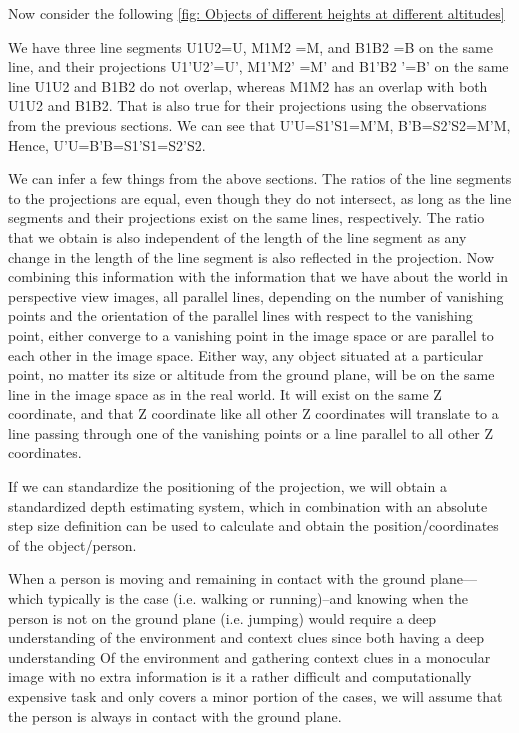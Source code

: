 Now consider the following \ref{fig: Objects of different heights at different altitudes}\newline

We have three line segments U1U2=U, M1M2 =M, and B1B2 =B on the same line, and their projections U1'U2'=U', M1'M2' =M' and B1'B2 '=B' on the same line U1U2 and B1B2 do not overlap, whereas M1M2 has an overlap with both U1U2 and B1B2. That is also true for their projections using the observations from the previous sections. We can see that U'U=S1'S1=M'M, B'B=S2'S2=M'M, Hence, U'U=B'B=S1'S1=S2'S2.\newline

We can infer a few things from the above sections. The ratios of the line segments to the projections are equal, even though they do not intersect, as long as the line segments and their projections exist on the same lines, respectively. The ratio that we obtain is also independent of the length of the line segment as any change in the length of the line segment is also reflected in the projection. Now combining this information with the information that we have about the world in perspective view images, all parallel lines, depending on the number of vanishing points and the orientation of the parallel lines with respect to the vanishing point, either converge to a vanishing point in the image space or are parallel to each other in the image space. Either way, any object situated at a particular point, no matter its size or altitude from the ground plane, will be on the same line in the image space as in the real world. It will exist on the same Z coordinate, and that Z coordinate like all other Z coordinates will translate to a line passing through one of the vanishing points or a line parallel to all other Z coordinates.\newline

If we can standardize the positioning of the projection, we will obtain a standardized depth estimating system, which in combination with an absolute step size definition can be used to calculate and obtain the position/coordinates of the object/person.\newline

When a person is moving and remaining in contact with the ground plane—which typically is the case (i.e. walking or running)--and knowing when the person is not on the ground plane (i.e. jumping) would require a deep understanding of the environment and context clues since both having a deep understanding Of the environment and gathering context clues in a monocular image with no extra information is it a rather difficult and computationally expensive task and only covers a minor portion of the cases, we will assume that the person is always in contact with the ground plane.\newline


